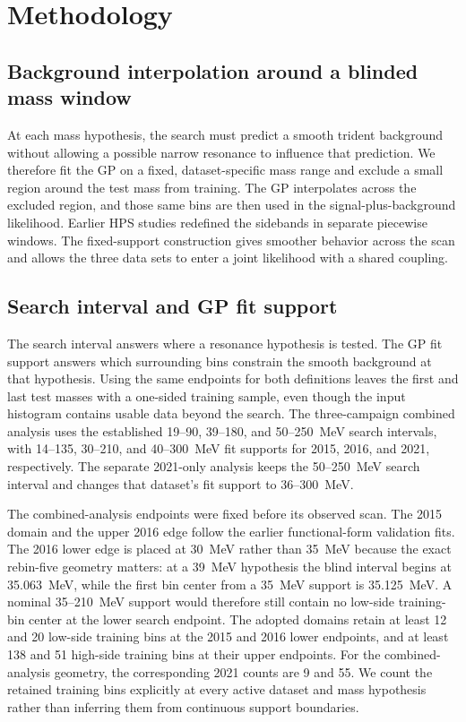 \section{Methodology}
\label{sec:methodology}

\subsection{Background interpolation around a blinded mass window}

At each mass hypothesis, the search must predict a smooth trident background without
allowing a possible narrow resonance to influence that prediction. We therefore fit the
GP on a fixed, dataset-specific mass range and exclude a small region around the test
mass from training. The GP interpolates across the excluded region, and those same bins
are then used in the signal-plus-background likelihood. Earlier HPS studies redefined
the sidebands in separate piecewise windows. The fixed-support construction gives
smoother behavior across the scan and allows the three data sets to enter a joint
likelihood with a shared coupling.

\subsection{Search interval and GP fit support}
\label{sec:fit-support-policy}

The search interval answers where a resonance hypothesis is tested. The GP fit support
answers which surrounding bins constrain the smooth background at that hypothesis.
Using the same endpoints for both definitions leaves the first and last test masses
with a one-sided training sample, even though the input histogram contains usable
data beyond the search. The three-campaign combined analysis uses the established
19--90, 39--180, and 50--250~MeV search intervals, with 14--135, 30--210, and
40--300~MeV fit supports for 2015, 2016, and 2021, respectively. The separate
2021-only analysis keeps the 50--250~MeV search interval and changes that dataset's fit
support to 36--300~MeV.

The combined-analysis endpoints were fixed before its observed scan. The 2015 domain and the
upper 2016 edge follow the earlier functional-form validation fits. The 2016 lower
edge is placed at 30~MeV rather than 35~MeV because the exact
rebin-five geometry matters: at a 39~MeV hypothesis the blind interval begins at
35.063~MeV, while the first bin center from a 35~MeV support is 35.125~MeV. A nominal
35--210~MeV support would therefore still contain no low-side training-bin center at
the lower search endpoint. The adopted domains retain at least 12 and 20 low-side
training bins at the 2015 and 2016 lower endpoints, and at least 138 and 51 high-side
training bins at their upper endpoints. For the combined-analysis geometry, the
corresponding 2021 counts are 9 and 55.
We count the retained training bins explicitly at every active dataset and mass
hypothesis rather than inferring them from continuous support boundaries.

